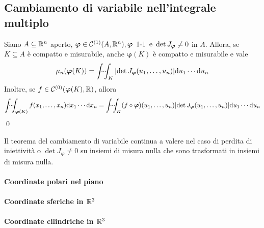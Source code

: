 \subsection{Cambiamento di variabile nell'integrale multiplo}

\begin{theorem}
    Siano $A \subseteq \mathbb{R}^n$ aperto, $\bm\varphi \in \C{1}(A,\R^n), \bm\varphi \ \inj \e \det J_{\bm\varphi} \neq 0$ in $A$. Allora, se $K \subseteq A$ è compatto e misurabile, anche $\bm\varphi(K)$ è compatto e misurabile e vale
    $$
        \mu_n(\bm\varphi(K))=\idotsint_K \abs{\det J_{\bm\varphi}(u_1,\dots,u_n)}\dd u_1 \cdots \dd u_n
    $$
    Inoltre, se $f \in \mathcal{C}^{(0)}(\bm\varphi(K),\mathbb{R})$, allora
    $$
        \idotsint_{\bm\varphi(K)}f(x_1,\dots,x_n)\dd x_1 \cdots \dd x_n=\idotsint_K (f \circ \bm\varphi)(u_1,\dots,u_n)\abs{\det J_{\bm\varphi}(u_1,\dots,u_n)}\dd u_1\cdots \dd u_n
    $$
    \qed
\end{theorem}

\begin{remark}
    Il teorema del cambiamento di variabile continua a valere nel caso di perdita di iniettività o $\det J_{\bm\varphi}\neq 0$ su insiemi di misura nulla che sono trasformati in insiemi di misura nulla.
\end{remark}

\paragraph{Coordinate polari nel piano}

\paragraph{Coordinate sferiche in $\mathbb{R}^3$}

\paragraph{Coordinate cilindriche in $\mathbb{R}^3$}

